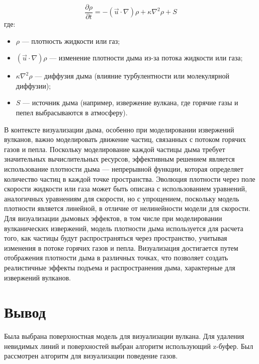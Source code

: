 \begin{equation}
	\label{eq:second_Navie_Stoks}
	\frac{\partial \rho}{\partial t} = -(\vec{u} \cdot \nabla) \rho + \kappa \nabla^2 \rho + S
\end{equation}
где:
\begin{itemize}
	\item \(\rho\) --- плотность жидкости или газ;
	\item \((\vec{u} \cdot \nabla) \rho\) --- изменение плотности дыма из-за потока жидкости или газа;
	\item \(\kappa \nabla^2 \rho\) --- диффузия дыма (влияние турбулентности или молекулярной диффузии);
	\item \(S\) --- источник дыма (например, извержение вулкана, где горячие газы и пепел выбрасываются в атмосферу).
\end{itemize}
	
В контексте визуализации дыма, особенно при моделировании извержений вулканов, важно моделировать движение частиц, связанных с потоком горячих газов и пепла. Поскольку моделирование каждой частицы дыма требует значительных вычислительных ресурсов, эффективным решением является использование плотности дыма --- непрерывной функции, которая определяет количество частиц в каждой точке пространства. Эволюция плотности через поле скорости жидкости или газа может быть описана с использованием уравнений, аналогичных уравнениям для скорости, но с упрощением, поскольку модель плотности является линейной, в отличие от нелинейности модели для скорости. Для визуализации дымовых эффектов, в том числе при моделировании вулканических извержений, модель плотности дыма используется для расчета того, как частицы будут распространяться через пространство, учитывая изменения в потоке горячих газов и пепла. Визуализация достигается путем отображения плотности дыма в различных точках, что позволяет создать реалистичные эффекты подъема и распространения дыма, характерные для извержений вулканов. 

\section*{Вывод}
Была выбрана поверхностная модель для визуализации вулкана.
Для удаления невидимых линий и поверхностей выбран алгоритм использующий z-буфер. Был рассмотрен алгоритм для визуализации поведение газов.
